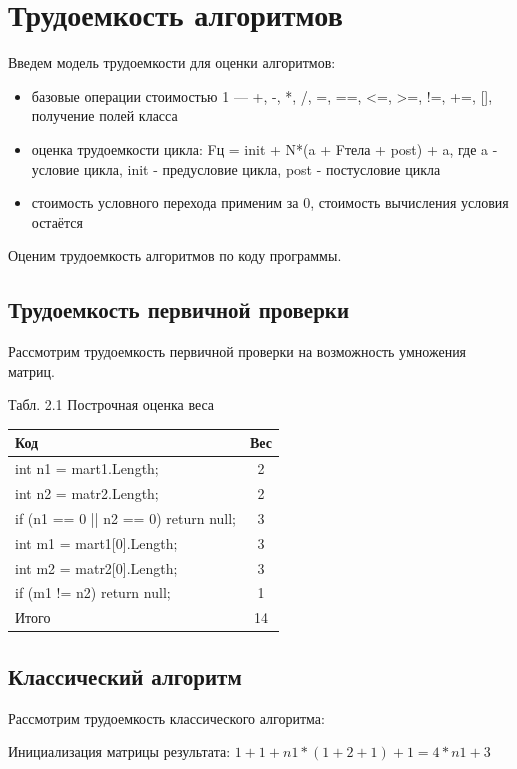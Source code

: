 \documentclass[12pt]{report}
\begin{document}
\newpage
\section{Трудоемкость алгоритмов}
Введем модель трудоемкости для оценки алгоритмов: 
\begin{itemize}
	\item базовые операции стоимостью 1 — +, -, *, /, =, ==, <=, >=, !=, +=, [], получение полей класса
	\item оценка трудоемкости цикла: Fц = init +  N*(a + Fтела + post) + a, где a - условие цикла, init - предусловие цикла, post - постусловие цикла
	\item стоимость условного перехода применим за 0, стоимость вычисления условия остаётся
\end{itemize}

Оценим трудоемкость алгоритмов по коду программы.

\subsection{Трудоемкость первичной проверки}
Рассмотрим трудоемкость первичной проверки на возможность умножения матриц.

\begin{center}
Табл. 2.1 Построчная оценка веса
	\begin{tabular}{|l c|} 
 	\hline
	Код & Вес \\ [0.5ex] 
 	\hline\hline
 	 int n1 = mart1.Length; & 2\\
 	\hline
	int n2 = matr2.Length; & 2\\
	\hline
	 if (n1  == 0 || n2 == 0) return null; & 3\\
	\hline
	int m1 = mart1[0].Length; & 3\\
	\hline
	int m2 = matr2[0].Length; & 3\\
	\hline
	if (m1 != n2) return null; & 1\\
	\hline\hline
	Итого & 14\\
	\hline
	\end{tabular}
\end{center}

\subsection{Классический алгоритм}
Рассмотрим трудоемкость классического алгоритма:  

Инициализация матрицы результата: $1 + 1 + n1*(1 + 2 + 1) + 1 = 4*n1 + 3$
\end{document}
